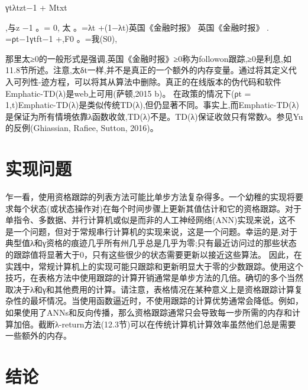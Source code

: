 γtλtzt−1 + Mtxt

,与z
−1
。= 0,
太
。=λt +(1−λt)英国《金融时报》
英国《金融时报》
.
=ρt−1γtft−1 +,F0
。=我(S0),

那里太≥0的一般形式是强调,英国《金融时报》≥0称为followon跟踪,≥0是利息,如11.8节所述。注意,太δt一样,并不是真正的一个额外的内存变量。通过将其定义代入可列性-迹方程，可以将其从算法中删除。真正的在线版本的伪代码和软件Emphatic-TD(λ)是web上可用(萨顿,2015 b)。
在政策的情况下(ρt = 1,t)Emphatic-TD(λ)是类似传统TD(λ),但仍显著不同。事实上,而Emphatic-TD(λ)是保证为所有情境依靠λ函数收敛,TD(λ)不是。TD(λ)保证收敛只有常数λ。参见Yu的反例(Ghiassian, Rafiee, Sutton, 2016)。


\section{实现问题}

乍一看，使用资格跟踪的列表方法可能比单步方法复杂得多。一个幼稚的实现将要求每个状态(或状态操作对)在每个时间步骤上更新其值估计和它的资格跟踪。对于单指令、多数据、并行计算机或似是而非的人工神经网络(ANN)实现来说，这不是一个问题，但对于常规串行计算机的实现来说，这是一个问题。幸运的是,对于典型值λ和γ资格的痕迹几乎所有州几乎总是几乎为零;只有最近访问过的那些状态的跟踪值将显著大于0，只有这些很少的状态需要更新以接近这些算法。
因此，在实践中，常规计算机上的实现可能只跟踪和更新明显大于零的少数跟踪。使用这个技巧，在表格方法中使用跟踪的计算开销通常是单步方法的几倍。确切的多个当然取决于λ和γ和其他费用的计算。请注意，表格情况在某种意义上是资格跟踪计算复杂性的最坏情况。当使用函数逼近时，不使用跟踪的计算优势通常会降低。例如，如果使用了ANNs和反向传播，那么资格跟踪通常只会导致每一步所需的内存和计算加倍。截断λ-return方法(12.3节)可以在传统计算机计算效率虽然他们总是需要一些额外的内存。

\section{结论}

